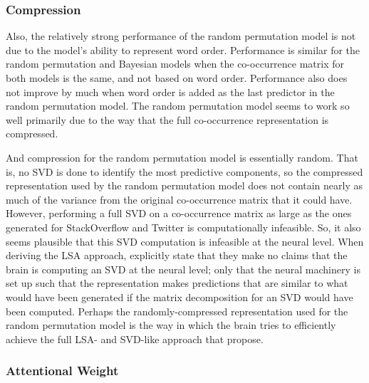 \documentclass[man,floatsintext,donotrepeattitle]{apa6}
\begin{document}
\subsubsection{Compression}

Also, the relatively strong performance of the random permutation model is not due to the model's ability to represent word order.
Performance is similar for the random permutation and Bayesian models when the co-occurrence matrix for both models is the same, and not based on word order.
Performance also does not improve by much when word order is added as the last predictor in the random permutation model.
The random permutation model seems to work so well primarily due to the way that the full co-occurrence representation is compressed.

And compression for the random permutation model is essentially random.
That is, no SVD is done to identify the most predictive components,
so the compressed representation used by the random permutation model does not contain nearly as much of the variance from the original co-occurrence matrix that it could have.
However, performing a full SVD on a co-occurrence matrix as large as the ones generated for StackOverflow and Twitter is computationally infeasible.
So, it also seems plausible that this SVD computation is infeasible at the neural level.
When deriving the LSA approach, \textcite{Landauer1997} explicitly state that they make no claims that the brain is computing an SVD at the neural level;
only that the neural machinery is set up such that the representation makes predictions that are similar to what would have been generated if the matrix decomposition for an SVD would have been computed.
Perhaps the randomly-compressed representation used for the random permutation model is the way in which the brain tries to efficiently achieve the full LSA- and SVD-like approach that \citeauthor{Landauer1997} propose.

\subsubsection{Attentional Weight}
\end{document}
